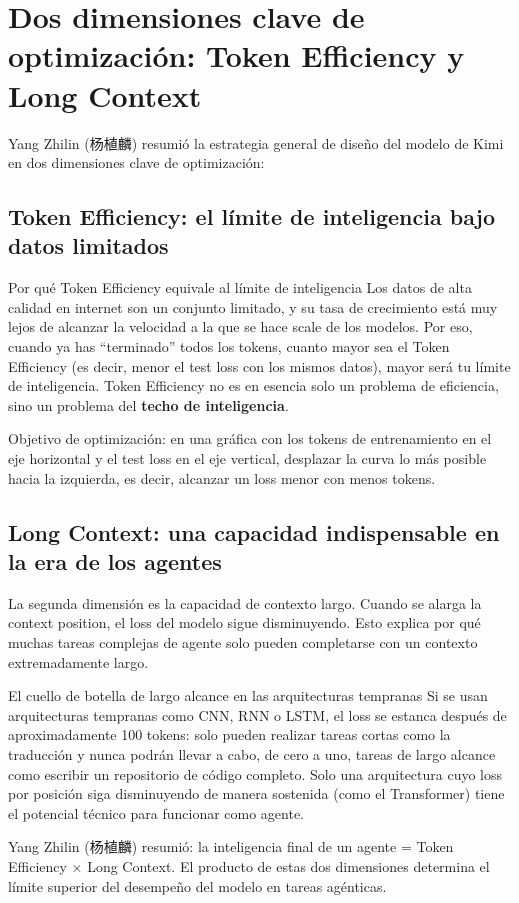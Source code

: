 \section{Dos dimensiones clave de optimización: Token Efficiency y Long Context}

Yang Zhilin (杨植麟) resumió la estrategia general de diseño del modelo de Kimi en dos dimensiones clave de optimización:

\subsection{Token Efficiency: el límite de inteligencia bajo datos limitados}

\begin{importantbox}{Por qué Token Efficiency equivale al límite de inteligencia}
Los datos de alta calidad en internet son un conjunto limitado, y su tasa de crecimiento está muy lejos de alcanzar la velocidad a la que se hace scale de los modelos. Por eso, cuando ya has ``terminado'' todos los tokens, cuanto mayor sea el Token Efficiency (es decir, menor el test loss con los mismos datos), mayor será tu límite de inteligencia. Token Efficiency no es en esencia solo un problema de eficiencia, sino un problema del \textbf{techo de inteligencia}.
\end{importantbox}

Objetivo de optimización: en una gráfica con los tokens de entrenamiento en el eje horizontal y el test loss en el eje vertical, desplazar la curva lo más posible hacia la izquierda, es decir, alcanzar un loss menor con menos tokens.

\subsection{Long Context: una capacidad indispensable en la era de los agentes}

La segunda dimensión es la capacidad de contexto largo. Cuando se alarga la context position, el loss del modelo sigue disminuyendo. Esto explica por qué muchas tareas complejas de agente solo pueden completarse con un contexto extremadamente largo.

\begin{warningbox}{El cuello de botella de largo alcance en las arquitecturas tempranas}
Si se usan arquitecturas tempranas como CNN, RNN o LSTM, el loss se estanca después de aproximadamente 100 tokens: solo pueden realizar tareas cortas como la traducción y nunca podrán llevar a cabo, de cero a uno, tareas de largo alcance como escribir un repositorio de código completo. Solo una arquitectura cuyo loss por posición siga disminuyendo de manera sostenida (como el Transformer) tiene el potencial técnico para funcionar como agente.
\end{warningbox}

Yang Zhilin (杨植麟) resumió: la inteligencia final de un agente = Token Efficiency $\times$ Long Context. El producto de estas dos dimensiones determina el límite superior del desempeño del modelo en tareas agénticas.

